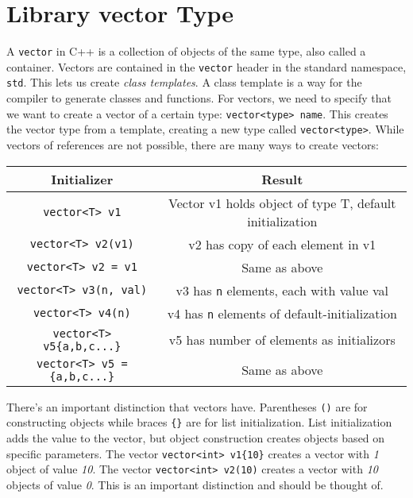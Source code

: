 \documentclass[12pt, a4paper]{report}
\begin{document}
\section{Library vector Type}
A \verb|vector| in C++ is a collection of objects of the same type, also called a container. Vectors are contained in the \verb|vector| header in the standard namespace, \verb|std|. This lets us create \emph{class templates}. A class template is a way for the compiler to generate classes and functions. For vectors, 
we need to specify that we want to create a vector of a certain type: \verb|vector<type> name|. This creates the vector type from a template, creating a new type called \verb|vector<type>|. While vectors of references are not possible, there are many ways to create vectors:
\begin{center}
	\begin{tabular}{ |c|c| }
		\hline
		\textbf{Initializer} & \textbf{Result} \\
		\hline
		\verb|vector<T> v1| & Vector v1 holds object of type T, default initialization \\
		\hline
		\verb|vector<T> v2(v1)| & v2 has copy of each element in v1 \\
		\hline
		\verb|vector<T> v2 = v1| & Same as above \\
		\hline
		\verb|vector<T> v3(n, val)| & v3 has \verb|n| elements, each with value val \\
		\hline
		\verb|vector<T> v4(n)| & v4 has \verb|n| elements of default-initialization \\
		\hline
		\verb|vector<T> v5{a,b,c...}| & v5 has number of elements as initializors \\
		\hline
		\verb|vector<T> v5 = {a,b,c...}| & Same as above \\
		\hline
	\end{tabular}
\end{center}
There's an important distinction that vectors have. Parentheses \verb|()| are for constructing objects while braces \verb|{}| are for list initialization.
List initialization adds the value to the vector, but object construction creates objects based on specific parameters. 
The vector \verb|vector<int> v1{10}| creates a vector with \emph{1} object of value \emph{10}.
The vector \verb|vector<int> v2(10)| creates a vector with \emph{10} objects of value \emph{0}. This is an important distinction and should be thought of.	
\end{document}
